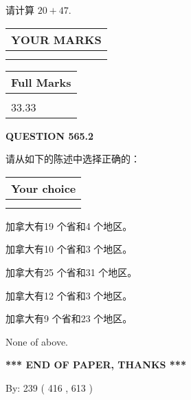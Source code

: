\documentclass{ctexart}
\begin{document}
  
 
请计算 $ %
20 +  %
47 $.
 

 

 
  
\vspace{0.2in}
  
\noindent\begin{tabular}{|l|}
\hline
 YOUR MARKS  \\
\hline
 \\ 
 \\ 
\hline
\end{tabular}
\hspace{0.05in} \begin{tabular}{|l|}
\hline
 Full Marks  \\
\hline
 \\ 
33.33 \\
\hline
\end{tabular}
{\textbf{\Large{QUESTION
565.2 
}}}
  
  
请从如下的陈述中选择正确的：
  
  
\noindent\hspace{3.0in} \begin{tabular}{|l|}
\hline
Your choice \\
\hline
 \\ 
 \\ 
\hline
\end{tabular}
  
  
 
 
加拿大有19 个省和4 个地区。
 
 
加拿大有10 个省和3 个地区。
 
 
加拿大有25 个省和31 个地区。
 
 
加拿大有12 个省和3 个地区。
 
 
加拿大有9 个省和23 个地区。
 
 
 None of above.
 
 
   
   
 \vspace{0.2in}
 
   
   
   
   
\vspace{1.0in} 
{\textbf{\large{ *** END OF PAPER, THANKS *** }}} 
   
   
\hspace{1.0in} By: 
 239 ( 416 ,  613 )
   
\end{document}
